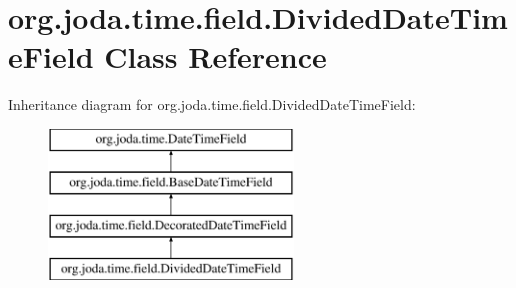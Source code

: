\hypertarget{classorg_1_1joda_1_1time_1_1field_1_1_divided_date_time_field}{\section{org.\-joda.\-time.\-field.\-Divided\-Date\-Time\-Field Class Reference}
\label{classorg_1_1joda_1_1time_1_1field_1_1_divided_date_time_field}
}
Inheritance diagram for org.\-joda.\-time.\-field.\-Divided\-Date\-Time\-Field\-:\begin{figure}[H]
\begin{center}
\leavevmode
\includegraphics[height=4.000000cm]{classorg_1_1joda_1_1time_1_1field_1_1_divided_date_time_field}
\end{center}
\end{figure}
